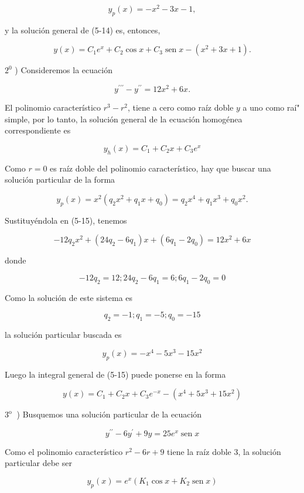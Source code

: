 \documentclass[10pt]{article}
\theoremstyle{plain}
\theoremstyle{definition}
\theoremstyle{remark}
\begin{document}
$$
y_{p}(x)=-x^{2}-3 x-1,
$$

y la solución general de (5-14) es, entonces,

$$
y(x)=C_{1} e^{x}+C_{2} \cos x+C_{3} \operatorname{sen} x-\left(x^{2}+3 x+1\right) .
$$

$2^{0}$ ) Consideremos la ecuación


\begin{equation*}
y^{\prime \prime \prime}-y^{\prime \prime}=12 x^{2}+6 x . \tag{5-15}
\end{equation*}


El polinomio característico $r^{3}-r^{2}$, tiene a cero como raíz doble $y$ a uno como raí" simple, por lo tanto, la solución general de la ecuación homogénea correspondiente es


$$
y_{h}(x)=C_{1}+C_{2} x+C_{3} e^{x}
$$

Como $r=0$ es raíz doble del polinomio característico, hay que buscar una solución particular de la forma

$$
y_{p}(x)=x^{2}\left(q_{2} x^{2}+q_{1} x+q_{0}\right)=q_{2} x^{4}+q_{1} x^{3}+q_{0} x^{2} .
$$

Sustituyéndola en (5-15), tenemos

$$
-12 q_{2} x^{2}+\left(24 q_{2}-6 q_{1}\right) x+\left(6 q_{1}-2 q_{0}\right)=12 x^{2}+6 x
$$

donde

$$
-12 q_{2}=12 ; 24 q_{2}-6 q_{1}=6 ; 6 q_{1}-2 q_{0}=0
$$

Como la solución de este sistema es

$$
q_{2}=-1 ; q_{1}=-5 ; q_{0}=-15
$$

la solución particular buscada es

$$
y_{p}(x)=-x^{4}-5 x^{3}-15 x^{2}
$$

Luego la integral general de (5-15) puede ponerse en la forma

$$
y(x)=C_{1}+C_{2} x+C_{3} e^{-x}-\left(x^{4}+5 x^{3}+15 x^{2}\right)
$$

$3^{\text {o }}$ ) Busquemos una solución particular de la ecuación


\begin{equation*}
y^{\prime \prime}-6 y^{\prime}+9 y=25 e^{x} \operatorname{sen} x \tag{5-16}
\end{equation*}


Como el polinomio característico $r^{2}-6 r+9$ tiene la raíz doble 3, la solución particular debe ser

$$
y_{p}(x)=e^{x}\left(K_{1} \cos x+K_{2} \operatorname{sen} x\right)
$$
\end{document}
